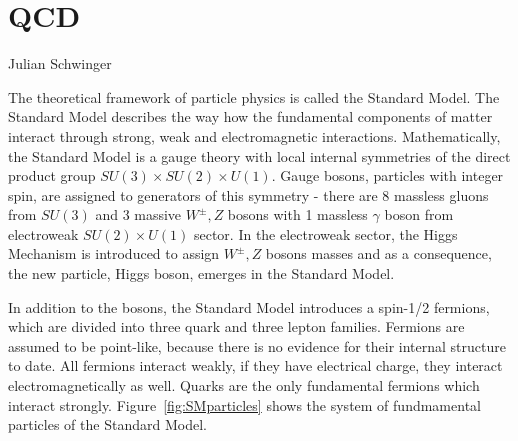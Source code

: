 \chapter{QCD}
\label{ch:qcd}

{Julian Schwinger}

The theoretical framework of particle physics is called the Standard Model. The
Standard Model describes the way how the fundamental components of matter
interact through strong, weak and electromagnetic interactions.
Mathematically, the
Standard Model is a gauge theory with local internal symmetries of
the direct product group $SU(3) \times SU(2) \times U(1)$. 
Gauge bosons, particles with integer spin, are assigned to generators of this
symmetry - there are 8 massless gluons from $SU(3)$ and 3 massive $W^\pm, Z$
bosons with 1 massless $\gamma$ boson from electroweak $SU(2) \times U(1)$
sector. 
In the electroweak sector, the Higgs Mechanism is introduced to assign $W^\pm, Z$
bosons masses and as a consequence, the new particle, Higgs boson, emerges in the
Standard Model. 

In addition to the bosons, the Standard Model introduces a spin-1/2 fermions,
which are divided into three quark and three lepton families. 
Fermions are assumed to be point-like, because there is no evidence for their
internal structure to date.
All fermions interact weakly, if they have electrical charge, they interact
electromagnetically as well. Quarks are the only fundamental fermions which
interact strongly. 
Figure~\ref{fig:SMparticles} shows the system of fundmamental particles of the
Standard Model.

